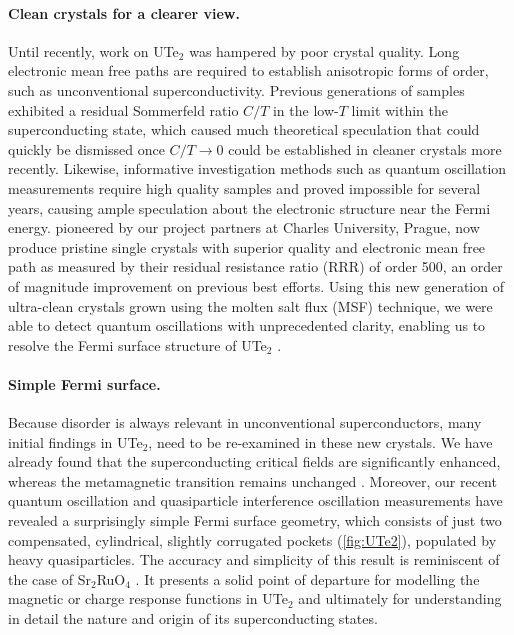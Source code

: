 \paragraph{Clean crystals for a clearer view.} Until recently, work on UTe$_2$ was hampered by poor crystal quality. Long electronic mean free paths are required to establish anisotropic forms of order, such as unconventional superconductivity. Previous generations of samples exhibited a residual Sommerfeld ratio $C/T$ in the low-$T$ limit within the superconducting state, which caused much theoretical speculation that could quickly be dismissed once $C/T \rightarrow 0$ could be established in cleaner crystals more recently. Likewise, informative investigation methods such as quantum oscillation measurements require high quality samples and proved impossible for several years, causing ample speculation about the electronic structure near the Fermi energy.   pioneered by our project partners at Charles University, Prague, now produce pristine single crystals with superior quality and electronic mean free path as measured by their residual resistance ratio (RRR) of order 500, an order of magnitude improvement on previous best efforts. Using this new generation of ultra-clean crystals grown using the molten salt flux (MSF) technique, we were able to detect quantum oscillations with unprecedented clarity, enabling us to resolve the Fermi surface structure of UTe$_2$ \cite{eaton23}. %

\paragraph{Simple Fermi surface.} Because disorder is always relevant in unconventional superconductors, many initial findings in UTe$_2$, need to be re-examined in these new crystals. We have already found that the superconducting critical fields are significantly enhanced, whereas the metamagnetic transition remains unchanged \cite{wu23}. Moreover, our recent quantum oscillation and quasiparticle interference oscillation measurements \cite{eaton23,weinberger23} have revealed a surprisingly simple Fermi surface geometry, which consists of just two compensated, cylindrical, slightly corrugated pockets (\autoref{fig:UTe2}), populated by heavy quasiparticles. The accuracy and simplicity of this result is reminiscent of the case of Sr$_2$RuO$_4$ \cite{bergemann03}. It presents a solid point of departure for modelling the magnetic or charge response functions in UTe$_2$ and ultimately for understanding in detail the nature and origin of its superconducting states.

